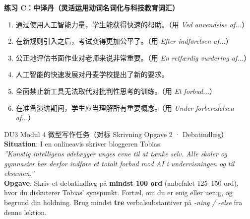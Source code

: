\textbf{练习 C：中译丹（灵活运用动词名词化与科技教育词汇）}
\begin{enumerate}
  \item 通过使用人工智能力量，学生能获得快速的帮助。（用 \textit{Ved anvendelse af...}）
  \item 在新规则引入之后，考试变得更加公平了。（用 \textit{Efter indførelsen af...}）
  \item 公正地评估书面作业对老师来说非常重要。（用 \textit{En retfærdig vurdering af...}）
  \item 人工智能的快速发展对丹麦学校提出了新的要求。
  \item 全面禁止新工具无法取代对批判性思考的训练。（用 \textit{Et forbud...}）
  \item 在准备演讲期间，学生应当理解所有重要概念。（用 \textit{Under forberedelsen af...}）
\end{enumerate}


\begin{emailbox}{DU3 Modul 4 微型写作任务（对标 Skrivning Opgave 2 · Debatindlæg）}
\textbf{Situation}: I en onlineavis skriver bloggeren Tobias:\\
\textit{”Kunstig intelligens ødelægger unges evne til at tænke selv. Alle skoler og gymnasier bør derfor indføre et totalt forbud mod AI i undervisningen og til eksamen.”}\\[4pt]
\textbf{Opgave}: Skriv et debatindlæg på \textbf{mindst 100 ord} (anbefalet 125--150 ord), hvor du diskuterer Tobias' synspunkt. Fortæl, om du er enig eller uenig, og begrund din holdning. Brug mindst \textbf{tre} verbalsubstantiver på \textit{-ning / -else} fra denne lektion.
\end{emailbox}

